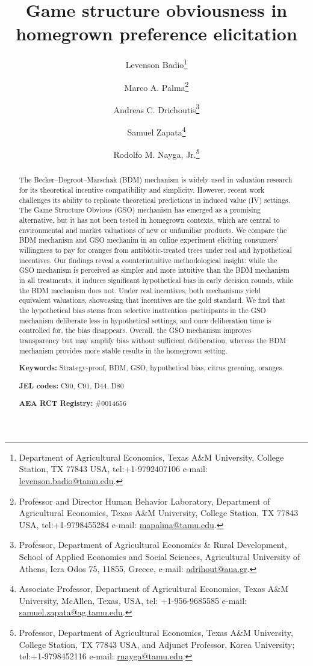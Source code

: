\documentclass[12pt]{article}
\title{\textbf{Game structure obviousness in homegrown preference elicitation}}
\author[1]{Levenson Badio\thanks{Department of Agricultural Economics, Texas A\&M University, College Station, TX  77843 USA, tel:+1-9792407106 e-mail: \href{mailto:levenson.badio@tamu.edu}{levenson.badio@tamu.edu}.}}
\author[1]{Marco A. Palma\thanks{Professor and Director Human Behavior Laboratory, Department of Agricultural Economics, Texas A\&M University, College Station, TX  77843 USA, tel:+1-9798455284 e-mail: \href{mailto:mapalma@tamu.edu}{mapalma@tamu.edu}.}}
\author[2]{Andreas C. Drichoutis\thanks{Professor, Department of Agricultural Economics \& Rural Development, School of Applied Economics and Social Sciences, Agricultural University of Athens, Iera Odos 75, 11855, Greece, e-mail: \href{mailto:adrihout@aua.gr}{adrihout@aua.gr}.}}
\author[1]{Samuel Zapata\thanks{Associate Professor, Department of Agricultural Economics, Texas A\&M University, McAllen, Texas, USA, tel: +1-956-9685585 e-mail: \href{samuel.zapata@ag.tamu.edu}{samuel.zapata@ag.tamu.edu}.}}
\author[1]{Rodolfo M. Nayga, Jr.\thanks{Professor, Department of Agricultural Economics, Texas A\&M University, College Station, TX  77843 USA, and Adjunct Professor, Korea University; tel:+1-9798452116 e-mail: \href{mailto:rnayga@tamu.edu}{rnayga@tamu.edu}.}}
\affil[1]{Texas A\&M University}
\affil[2]{Agricultural University of Athens}
\date{}
\begin{document}
\maketitle
 \onehalfspacing

\begin{abstract}
\noindent The Becker–Degroot–Marschak (BDM) mechanism is widely used in valuation research for its theoretical incentive compatibility and simplicity. However, recent work challenges its ability to replicate theoretical predictions in induced value (IV) settings. The Game Structure Obvious (GSO) mechanism has emerged as a promising alternative, but it has not been tested in homegrown contexts, which are central to environmental and market valuations of new or unfamiliar products.
We compare the BDM mechanism and GSO mechanim in an online experiment eliciting consumers’ willingness to pay for oranges from antibiotic-treated trees under real and hypothetical incentives.
Our findings reveal a counterintuitive methodological insight: while the GSO mechanism is perceived as simpler and more intuitive than the BDM mechanism in all treatments, it induces significant hypothetical bias in early decision rounds, while the BDM mechanism does not. Under real incentives, both mechanisms yield equivalent valuations, showcasing that incentives are the gold standard. 
We find that the hypothetical bias stems from selective inattention--participants in the GSO mechanism deliberate less in hypothetical settings, and once deliberation time is controlled for, the bias disappears. Overall, the GSO mechanism improves transparency but may amplify bias without sufficient deliberation, whereas the BDM mechanism provides more stable results in the homegrown setting.

\textbf{Keywords:} Strategy-proof, BDM, GSO, hypothetical bias, citrus greening, oranges. 
	
\textbf{JEL codes:} C90, C91, D44, D80
 
 \textbf{AEA RCT Registry:} \#0014656
 
 \end{abstract}


\onehalfspacing
\end{document}
